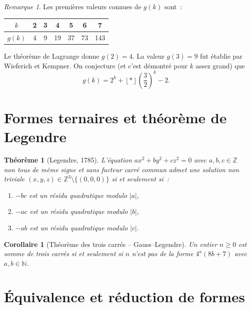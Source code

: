 \documentclass[12pt,a4paper,openany]{book}
\theoremstyle{definition}
\theoremstyle{plain}
\newtheorem{theoreme}[definition]{Théorème}
\newtheorem{corollaire}[definition]{Corollaire}
\theoremstyle{remark}
\newtheorem{remarque}[definition]{Remarque}
\newcommand{\N}{\mathbb{N}}
\newcommand{\Z}{\mathbb{Z}}
\newcommand{\abs}[1]{\left|#1\right|}
\newcommand{\floor}[1]{\left\lfloor #1 \right\rfloor}
\begin{document}
\begin{remarque}
\label{rem:valeurs-gk}
Les premières valeurs connues de $g(k)$ sont~:
\begin{center}
\begin{tabular}{c|cccccc}
\toprule
$k$ & 2 & 3 & 4 & 5 & 6 & 7 \\
\midrule
$g(k)$ & 4 & 9 & 19 & 37 & 73 & 143 \\
\bottomrule
\end{tabular}
\end{center}
Le théorème de Lagrange donne $g(2) = 4$. La valeur $g(3) = 9$ fut établie par
Wieferich et Kempner. On conjecture (et c'est démontré
pour $k$ assez grand) que
\[
  g(k) = 2^k + \floor*{\left(\frac{3}{2}\right)^k} - 2.
\]
\end{remarque}

\section{Formes ternaires et théorème de Legendre}
\label{sec:formes-ternaires}

\begin{theoreme}[Legendre, 1785]
\label{thm:legendre-ternaire}
L'équation $ax^2 + by^2 + cz^2 = 0$ avec $a, b, c \in \Z$ non tous de même signe et
sans facteur carré commun admet une solution non triviale $(x,y,z) \in \Z^3 \setminus
\{(0,0,0)\}$ si et seulement si~:
\begin{enumerate}[label=(\roman*)]
  \item $-bc$ est un résidu quadratique modulo $\abs{a}$,
  \item $-ac$ est un résidu quadratique modulo $\abs{b}$,
  \item $-ab$ est un résidu quadratique modulo $\abs{c}$.
\end{enumerate}
\end{theoreme}

\begin{corollaire}[Théorème des trois carrés -- Gauss--Legendre]
\label{cor:trois-carres}
Un entier $n \geq 0$ est somme de trois carrés si et seulement si $n$ n'est pas de la
forme $4^a(8b+7)$ avec $a, b \in \N$.
\end{corollaire}

\section{Équivalence et réduction de formes}
\label{sec:equivalence-reduction}
\end{document}
